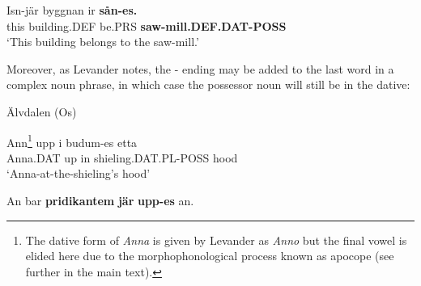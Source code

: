  \ea\label{}
\gll Isn-jär  byggnan  ir  \textbf{sån-es.}\\


this  building.DEF  be.PRS  \textbf{saw-mill.DEF.DAT-POSS}\\

\glt  ‘This building belongs to the saw-mill.’

\z

Moreover, as Levander notes, the \nobreakdash- ending may be added to the last word in a complex noun phrase, in which case the possessor noun will still be in the dative:


\item 

Älvdalen (Os)



\item 


 \ea\label{}
\gll Ann\footnote{ The dative form of \textit{Anna} is given by Levander as \textit{Anno} but the final vowel is elided here due to the morphophonological process known as apocope (see further in the main text).}  upp  i  budum-es   etta \\


Anna.DAT  up  in  shieling.DAT.PL-POSS  hood\\

\glt ‘Anna-at-the-shieling’s hood’ 

\z

\item 


 \ea\label{}
\gll An  bar  \textbf{pridikantem}\textbf{  jär}\textbf{  upp-es} an. \\


